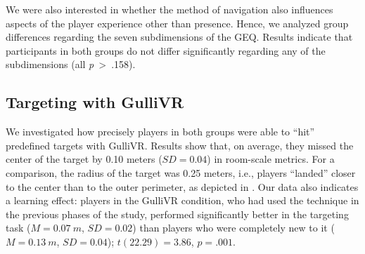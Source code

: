 \documentclass{sigchi}
\begin{document}
We were also interested in whether the method of navigation also influences aspects of the player experience other than presence. Hence, we analyzed group differences regarding the seven subdimensions of the GEQ. Results indicate that participants in both groups do not differ significantly regarding any of the subdimensions (all \textit{p}~>~.158).




\subsection{Targeting with GulliVR}

We investigated how precisely players in both groups were able to ``hit'' predefined targets with GulliVR. Results show that, on average, they missed the center of the target by 0.10 meters %
($SD=0.04$) in room-scale metrics. For a comparison, the radius of the target was 0.25 meters, i.e., players ``landed'' closer to the center than to the outer perimeter, as depicted in . %
Our data also indicates a learning effect: players in the GulliVR condition, who had used the technique in the previous phases of the study, performed significantly better in the targeting task ($M=0.07~m$, $SD=0.02$) than players who were completely new to it ($M=0.13~m$, $SD=0.04$); $t(22.29)=3.86$, $p=.001$.
\end{document}

